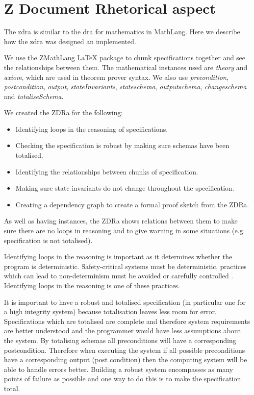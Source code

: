 \chapter{Z Document Rhetorical aspect}
\label{ch:zdra}
The \gls{zdra} is similar to the \gls{dra} for mathematics in MathLang. Here we describe how
the \gls{zdra} was designed an implemented. 

We use the ZMathLang \LaTeX{} package to chunk specifications together and see
the relationships between them. The mathematical instances used are
\textit{theory} and \textit{axiom}, which are used in theorem prover syntax. We
also use \textit{precondition}, \textit{postcondition}, \textit{output},
\textit{stateInvariants}, \textit{stateschema}, \textit{outputschema},
\textit{changeschema} and \textit{totaliseSchema}.

We created the ZDRa for the following:

\begin{itemize}

\item Identifying loops in the reasoning of specifications.
\item Checking the specification is robust by making sure schemas have been
totalised.
\item Identifying the relationships between chunks of specification.
\item Making sure state invariants do not change throughout the specification.
\item Creating a dependency graph to create a formal proof sketch from the ZDRa.
\end{itemize}

As well as having instances, the ZDRa shows relations between them to make sure
there are no loops in reasoning and to give warning in some situations (e.g.
specification is not totalised).

Identifying loops in the reasoning is important as it determines whether the
program is deterministic. Safety-critical systems must be deterministic,
practices which can lead to non-determinism must be avoided or carefully
controlled \cite{rierson2013developing}. Identifying loops in the reasoning is one of these practices. 

It is important to have a robust and totalised specification (in particular one
for a high integrity system) because totalisation leaves less room for error.
Specifications which are totalised are complete and therefore system
requirements are better understood and the programmer would have
less assumptions about the system.
By totalising schemas all preconditions will have a corresponding postcondition.
Therefore when executing the system if all possible preconditions have a
corresponding output (post condition) then the computing system will be able to
handle errors better. Building a robust system encompasses as many points of
failure  as possible and one way to do this is to make the specification total.

